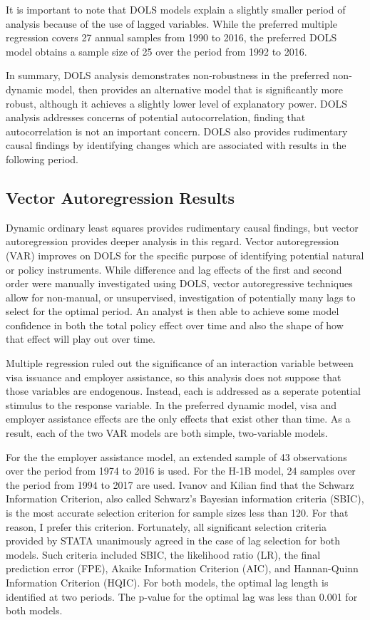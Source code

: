 \documentclass[review]{elsarticle}
\begin{document}
It is important to note that DOLS models explain a slightly smaller period of analysis because of the use of lagged variables.
While the preferred multiple regression covers 27 annual samples from 1990 to 2016,
the preferred DOLS model obtains a sample size of 25 over the period from 1992 to 2016.

In summary, DOLS analysis demonstrates non-robustness in the preferred non-dynamic model,
then provides an alternative model that is significantly more robust, although it
achieves a slightly lower level of explanatory power.
DOLS analysis addresses concerns of potential autocorrelation,
finding that autocorrelation is not an important concern.
DOLS also provides rudimentary causal findings by identifying changes which are associated with results in the following period.

\subsection{Vector Autoregression Results}

Dynamic ordinary least squares provides rudimentary causal findings,
but vector autoregression provides deeper analysis in this regard.
Vector autoregression (VAR) improves on DOLS for the specific purpose
of identifying potential natural or policy instruments.
While difference and lag effects of the first and second order were manually investigated using DOLS,
vector autoregressive techniques allow for non-manual, or unsupervised,
investigation of potentially many lags to select for the optimal period.
An analyst is then able to achieve some model confidence in both the total policy effect over time
and also the shape of how that effect will play out over time.

Multiple regression ruled out the significance of an interaction variable between
visa issuance and employer assistance,
so this analysis does not suppose that those variables are endogenous.
Instead, each is addressed as a seperate potential stimulus to the response variable.
In the preferred dynamic model, visa and employer assistance effects
are the only effects that exist other than time.
As a result, each of the two VAR models are both simple, two-variable models.

For the the employer assistance model,
an extended sample of 43 observations
over the period from 1974 to 2016 is used.
For the H-1B model, 24 samples over the period from 1994 to 2017 are used.
Ivanov and Kilian find that the Schwarz Information Criterion,
also called Schwarz's Bayesian information criteria (SBIC),
is the most accurate selection criterion for sample sizes less than 120\cite{ivanov2005practitioner}.
For that reason, I prefer this criterion.
Fortunately, all significant selection criteria provided by STATA unanimously agreed in the case of lag selection for both models.
Such criteria included SBIC, the likelihood ratio (LR), the final prediction error (FPE),
Akaike Information Criterion (AIC), and Hannan-Quinn Information Criterion (HQIC).
For both models, the optimal lag length is identified at two periods.
The p-value for the optimal lag was less than 0.001 for both models.
\end{document}
